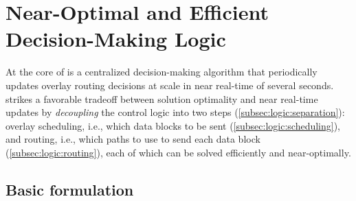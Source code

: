 \section{Near-Optimal and Efficient Decision-Making Logic}
\label{sec:logic}

At the core of \name is a centralized decision-making algorithm that
periodically updates overlay routing decisions at scale in near
real-time of several seconds. \name strikes a favorable tradeoff
between solution optimality and near real-time updates by
{\em decoupling} the control logic into two steps
(\Section\ref{subsec:logic:separation}):
overlay scheduling, i.e., which data blocks to be sent
(\Section\ref{subsec:logic:scheduling}),
and routing, i.e., which paths to use to send each data block
(\Section\ref{subsec:logic:routing}), each of which
can be solved efficiently and near-optimally.%

\subsection{Basic formulation}
\label{subsec:logic:formulation}


